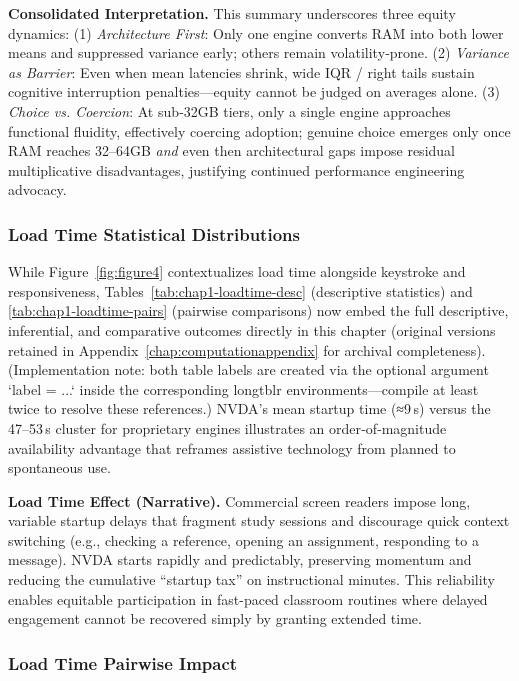 \noindent\textbf{Consolidated Interpretation.} This summary underscores three equity dynamics: (1) \emph{Architecture First}: Only one engine converts RAM into both lower means and suppressed variance early; others remain volatility‑prone. (2) \emph{Variance as Barrier}: Even when mean latencies shrink, wide IQR / right tails sustain cognitive interruption penalties—equity cannot be judged on averages alone. (3) \emph{Choice vs. Coercion}: At sub‑32GB tiers, only a single engine approaches functional fluidity, effectively coercing adoption; genuine choice emerges only once RAM reaches 32–64GB \emph{and} even then architectural gaps impose residual multiplicative disadvantages, justifying continued performance engineering advocacy.

\subsubsection{Load Time Statistical Distributions}

While Figure~\ref{fig:figure4} contextualizes load time alongside keystroke and  responsiveness, Tables~\ref{tab:chap1-loadtime-desc} (descriptive statistics) and \ref{tab:chap1-loadtime-pairs} (pairwise comparisons) now embed the full descriptive, inferential, and comparative outcomes directly in this chapter (original versions retained in Appendix~\ref{chap:computationappendix} for archival completeness). (Implementation note: both table labels are created via the optional argument `label = {...}` inside the corresponding longtblr environments—compile at least twice to resolve these references.) NVDA’s mean startup time (≈9\,s) versus the 47–53\,s cluster for proprietary engines illustrates an order‑of‑magnitude availability advantage that reframes assistive technology from planned to spontaneous use.

\noindent\textbf{Load Time Effect (Narrative).} Commercial screen readers impose long, variable startup delays that fragment study sessions and discourage quick context switching (e.g., checking a reference, opening an assignment, responding to a message). NVDA starts rapidly and predictably, preserving momentum and reducing the cumulative “startup tax” on instructional minutes. This reliability enables equitable participation in fast-paced classroom routines where delayed engagement cannot be recovered simply by granting extended time.

\subsubsection{Load Time Pairwise Impact}

